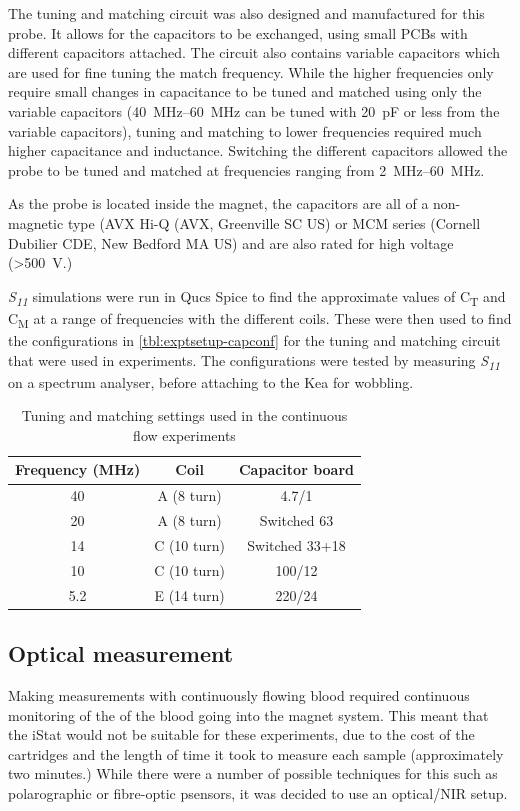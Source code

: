 The tuning and matching circuit was also designed and manufactured for this probe.
It allows for the capacitors to be exchanged, using small PCBs with different capacitors attached.
The circuit also contains variable capacitors which are used for fine tuning the match frequency.
While the higher frequencies only require small changes in capacitance to be tuned and matched using only the variable capacitors (\SIrange[range-phrase = --]{40}{60}{MHz} can be tuned with \SI{20}{pF} or less from the variable capacitors), tuning and matching to lower frequencies required much higher capacitance and inductance.
Switching the different capacitors allowed the probe to be tuned and matched at frequencies ranging from \SIrange{2}{60}{\mega\hertz}.

As the probe is located inside the magnet, the capacitors are all of a non-magnetic type (AVX Hi-Q (AVX, Greenville SC US)  or MCM series (Cornell Dubilier CDE, New Bedford MA US) and are also rated for high voltage (\SI{>500}{V}.)

\textit{S\textsubscript{11}} simulations were run in Qucs Spice to find the approximate values of C\textsubscript{T} and C\textsubscript{M} at a range of frequencies with the different coils.
These were then used to find the configurations in \autoref{tbl:exptsetup-capconf} for the tuning and matching circuit that were used in experiments.
The configurations were tested by measuring \textit{S\textsubscript{11}} on a spectrum analyser, before attaching to the Kea for wobbling.

\begin{table}[ht]
\centering
\begin{tabular}{|c|c|c|}
\hline
Frequency (\si{MHz}) & Coil & Capacitor board\\
\hline
40 & A (8 turn) & 4.7/1 \\
20 & A (8 turn) & Switched 63 \\
14 & C (10 turn) & Switched 33+18 \\
10 & C (10 turn) & 100/12 \\
5.2 & E (14 turn) & 220/24 \\
\hline
\end{tabular}
\caption{Tuning and matching settings used in the continuous flow experiments}
\label{tbl:exptsetup-capconf}
\end{table}

\subsection{Optical \SOtwo measurement}
Making measurements with continuously flowing blood required continuous monitoring of the \SOtwo of the blood going into the magnet system.
This meant that the iStat would not be suitable for these experiments, due to the cost of the cartridges and the length of time it took to measure each sample (approximately two minutes.)
While there were a number of possible techniques for this such as polarographic or fibre-optic p\Otwo sensors, it was decided to use an optical/NIR setup.

